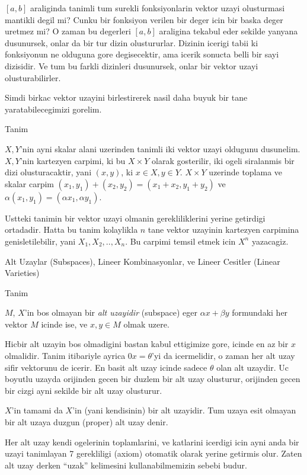 \documentclass[12pt,fleqn]{article}
\begin{document}
$[a,b]$ araliginda tanimli tum surekli fonksiyonlarin vektor uzayi
olusturmasi mantikli degil mi? Cunku bir fonksiyon verilen bir deger icin
bir baska deger uretmez mi? O zaman bu degerleri $[a,b]$ araligina tekabul
eder sekilde yanyana dusunursek, onlar da bir tur dizin
olustururlar. Dizinin icerigi tabii ki fonksiyonun ne olduguna gore
degisecektir, ama icerik sonucta belli bir sayi dizisidir. Ve tum bu farkli
dizinleri dusunursek, onlar bir vektor uzayi olusturabilirler. 

Simdi birkac vektor uzayini birlestirerek nasil daha buyuk bir tane
yaratabilecegimizi gorelim. 

Tanim

$X,Y$'nin ayni skalar alani uzerinden tanimli iki vektor uzayi oldugunu
dusunelim. $X,Y$'nin kartezyen carpimi, ki bu $X \times Y$ olarak
gosterilir, iki ogeli siralanmis bir dizi olusturacaktir, 
yani $(x,y)$, ki $ x \in X, y \in Y$. $X \times Y$ uzerinde toplama ve
skalar carpim $(x_1,y_1) + (x_2,y_2) = (x_1+x_2, y_1+y_2)$ ve
$\alpha(x_1,y_1) = (\alpha x_1,\alpha y_1)$. 

Ustteki tanimin bir vektor uzayi olmanin gerekliliklerini yerine getirdigi
ortadadir. Hatta bu tanim kolaylikla $n$ tane vektor uzayinin kartezyen
carpimina genisletilebilir, yani $X_1,X_2,..,X_n$. Bu carpimi temsil etmek
icin $X^n$ yazacagiz. 

Alt Uzaylar (Subspaces), Lineer Kombinasyonlar, ve Lineer Cesitler (Linear Varieties) 

Tanim 

$M$, $X$'in bos olmayan bir {\em alt uzayidir} (subspace) eger $\alpha x + \beta y$
formundaki her vektor $M$ icinde ise, ve $x,y \in M$ olmak uzere. 

Hicbir alt uzayin bos olmadigini bastan kabul ettigimize gore, icinde en az
bir $x$ olmalidir. Tanim itibariyle ayrica  $0 x = \theta$'yi da
icermelidir, o zaman her alt uzay sifir vektorunu de icerir. En basit alt
uzay icinde sadece $\theta$ olan alt uzaydir. Uc boyutlu uzayda orijinden
gecen bir duzlem bir alt uzay olusturur, orijinden gecen bir cizgi ayni
sekilde bir alt uzay olusturur. 

$X$'in tamami da $X$'in (yani kendisinin) bir alt uzayidir. Tum uzaya esit
olmayan bir alt uzaya duzgun (proper) alt uzay denir. 

Her alt uzay kendi ogelerinin toplamlarini, ve katlarini icerdigi icin ayni
anda bir uzayi tanimlayan 7 gerekliligi (axiom) otomatik olarak yerine
getirmis olur. Zaten alt uzay derken ``uzak'' kelimesini kullanabilmemizin
sebebi budur. 
\end{document}
